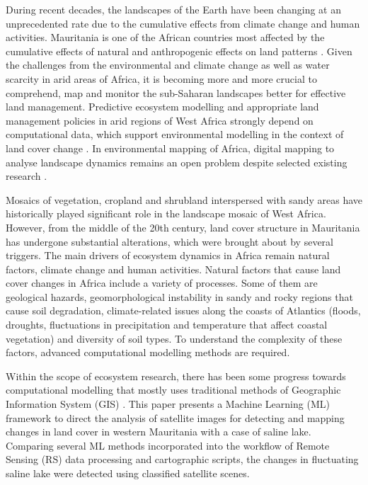 \documentclass[12pt,a4paper,oneside]{article}
\def \newpar{\vspace{6pt}}
\begin{document}
\newpar During recent decades, the landscapes of the Earth have been changing at an unprecedented rate due to the cumulative effects from climate change and human activities. Mauritania is one of the African countries most affected by the cumulative effects of natural and anthropogenic effects on land patterns  \citep{CHOPLIN201749}. Given the challenges from the environmental and climate change as well as water scarcity in arid areas of Africa, it is becoming more and more crucial to comprehend, map and monitor the sub-Saharan landscapes better for effective land management. Predictive ecosystem modelling and appropriate land management policies in arid regions of West Africa strongly depend on computational data, which support environmental modelling in the context of land cover change \citep{BOJER2024121394,PILLAY2021106595,Lemenkova202414}. In environmental mapping of Africa, digital mapping to analyse landscape dynamics remains an open problem despite selected existing research \citep{ALI2024113123,WALTHER2021146093,TWUMASIANKRAH2024176219,Lemenkova202413}. 

\newpar Mosaics of vegetation, cropland and shrubland interspersed with sandy areas have historically played significant role in the landscape mosaic of West Africa. However, from the middle of the 20th century, land cover structure in Mauritania has undergone substantial alterations, which were brought about by several triggers. The main drivers of ecosystem dynamics in Africa remain natural factors, climate change and human activities. Natural factors that cause land cover changes in Africa include a variety of processes. Some of them are geological hazards, geomorphological instability in sandy and rocky regions that cause soil degradation, climate-related issues along the coasts of Atlantics (floods, droughts, fluctuations in precipitation and temperature that affect coastal vegetation) and diversity of soil types. To understand the complexity of these factors, advanced computational modelling methods are required.

\newpar Within the scope of ecosystem research, there has been some progress towards computational modelling that mostly uses traditional methods of Geographic Information System (GIS) \citep{DUNGA2024108989,EBRAHIM2024101374,SHOKO2024103796,Lemenkova202412,Holloway}. This paper presents a Machine Learning (ML) framework to direct the analysis of satellite images for detecting and mapping changes in land cover in western Mauritania with a case of saline lake. Comparing several ML methods incorporated into the workflow of Remote Sensing (RS) data processing and cartographic scripts, the changes in fluctuating saline lake were detected using classified satellite scenes.
\end{document}

